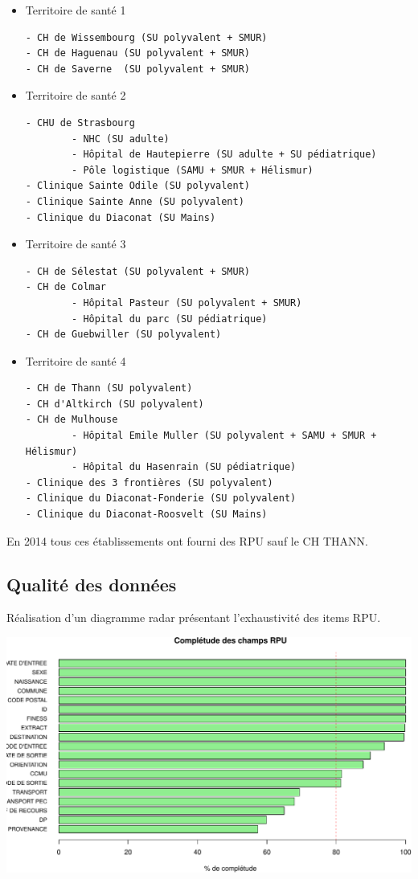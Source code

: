 \documentclass[]{article}
\begin{document}
\begin{itemize}
\item
  Territoire de santé 1

\begin{verbatim}
- CH de Wissembourg (SU polyvalent + SMUR)
- CH de Haguenau (SU polyvalent + SMUR)
- CH de Saverne  (SU polyvalent + SMUR)
\end{verbatim}
\item
  Territoire de santé 2

\begin{verbatim}
- CHU de Strasbourg
        - NHC (SU adulte)
        - Hôpital de Hautepierre (SU adulte + SU pédiatrique)
        - Pôle logistique (SAMU + SMUR + Hélismur)
- Clinique Sainte Odile (SU polyvalent)
- Clinique Sainte Anne (SU polyvalent)
- Clinique du Diaconat (SU Mains)
\end{verbatim}
\item
  Territoire de santé 3

\begin{verbatim}
- CH de Sélestat (SU polyvalent + SMUR)
- CH de Colmar 
        - Hôpital Pasteur (SU polyvalent + SMUR)
        - Hôpital du parc (SU pédiatrique)
- CH de Guebwiller (SU polyvalent)
\end{verbatim}
\item
  Territoire de santé 4

\begin{verbatim}
- CH de Thann (SU polyvalent)
- CH d'Altkirch (SU polyvalent)
- CH de Mulhouse
        - Hôpital Emile Muller (SU polyvalent + SAMU + SMUR + Hélismur)
        - Hôpital du Hasenrain (SU pédiatrique)
- Clinique des 3 frontières (SU polyvalent)
- Clinique du Diaconat-Fonderie (SU polyvalent)
- Clinique du Diaconat-Roosvelt (SU Mains)
\end{verbatim}
\end{itemize}

En 2014 tous ces établissements ont fourni des RPU sauf le CH THANN.

\subsection{Qualité des données}\label{qualite-des-donnees}

Réalisation d'un diagramme radar présentant l'exhaustivité des items
RPU.

\includegraphics{rapport2014_V4_files/figure-latex/completude-1.pdf}
\end{document}
